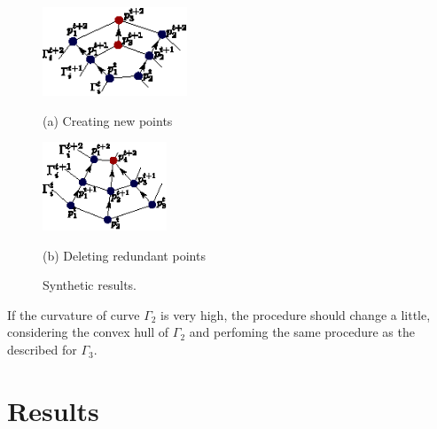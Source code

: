 \documentclass{article}
\begin{document}
\begin{figure}[t]
\begin{minipage}[b]{.5\linewidth}
  \centering
  \centerline{\includegraphics[width=4.3cm]{pics/nacimiento}}
  \centerline{(a) Creating new points}\medskip
\end{minipage}
\hfill
\begin{minipage}[b]{.48\linewidth}
  \centering
  \centerline{\includegraphics[width=3.7cm]{pics/muerte}}
  \centerline{(b) Deleting redundant points}\medskip
\end{minipage}
\caption{Synthetic results.}
\label{fig:nacimiento_y_muerte}
\end{figure}
If the curvature of curve $\Gamma_2$ is very high, the procedure should change a little, considering the convex hull of $\Gamma_2$ and perfoming the same procedure as the described for $\Gamma_3$.

\section{Results}
\label{sec:results}
\end{document}
